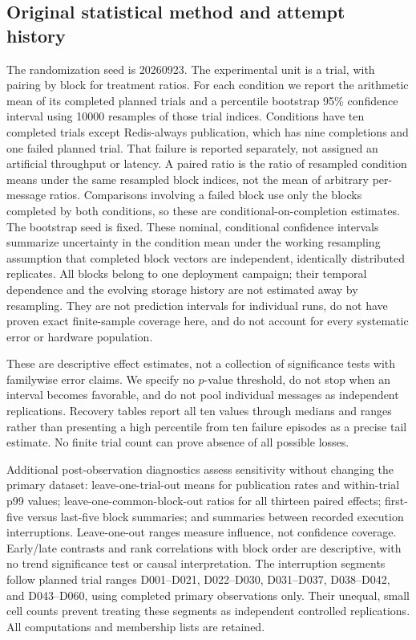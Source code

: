 \subsection{Original statistical method and attempt history}\label{app:history-method}
The randomization seed is 20260923. The experimental unit is a trial, with pairing by block for treatment ratios. For each condition we report the arithmetic mean of its completed planned trials and a percentile bootstrap 95\% confidence interval using 10000 resamples of those trial indices. Conditions have ten completed trials except Redis-always publication, which has nine completions and one failed planned trial. That failure is reported separately, not assigned an artificial throughput or latency. A paired ratio is the ratio of resampled condition means under the same resampled block indices, not the mean of arbitrary per-message ratios. Comparisons involving a failed block use only the blocks completed by both conditions, so these are conditional-on-completion estimates. The bootstrap seed is fixed. These nominal, conditional confidence intervals summarize uncertainty in the condition mean under the working resampling assumption that completed block vectors are independent, identically distributed replicates. All blocks belong to one deployment campaign; their temporal dependence and the evolving storage history are not estimated away by resampling. They are not prediction intervals for individual runs, do not have proven exact finite-sample coverage here, and do not account for every systematic error or hardware population.

These are descriptive effect estimates, not a collection of significance tests with familywise error claims. We specify no $p$-value threshold, do not stop when an interval becomes favorable, and do not pool individual messages as independent replications. Recovery tables report all ten values through medians and ranges rather than presenting a high percentile from ten failure episodes as a precise tail estimate. No finite trial count can prove absence of all possible losses.

Additional post-observation diagnostics assess sensitivity without changing the primary dataset: leave-one-trial-out means for publication rates and within-trial p99 values; leave-one-common-block-out ratios for all thirteen paired effects; first-five versus last-five block summaries; and summaries between recorded execution interruptions. Leave-one-out ranges measure influence, not confidence coverage. Early/late contrasts and rank correlations with block order are descriptive, with no trend significance test or causal interpretation. The interruption segments follow planned trial ranges D001--D021, D022--D030, D031--D037, D038--D042, and D043--D060, using completed primary observations only. Their unequal, small cell counts prevent treating these segments as independent controlled replications. All computations and membership lists are retained.


